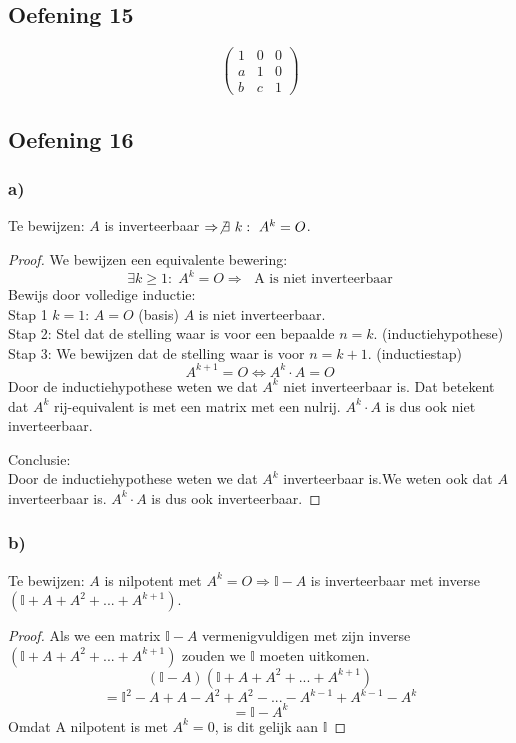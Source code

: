\documentclass[lineaire_algebra_oplossingen.tex]{subfiles}
\begin{document}
\subsection{Oefening 15}
\[
\begin{pmatrix}
1 & 0 & 0\\
a & 1 & 0\\
b & c & 1
\end{pmatrix}
\]

\subsection{Oefening 16}
\subsubsection*{a)}
Te bewijzen: $A$ is inverteerbaar $\Rightarrow \not \exists\ k :\ A^k=O$.
\begin{proof}
We bewijzen een equivalente bewering:
\[
\exists k\ge 1:\;A^k=O \Rightarrow\; \text{ A is niet inverteerbaar}
\]
Bewijs door volledige inductie:\\
Stap 1 $k=1$: $A=O$ (basis)
$A$ is niet inverteerbaar.\\
Stap 2: Stel dat de stelling waar is voor een bepaalde $n=k$. (inductiehypothese)\\

Stap 3: We bewijzen dat de stelling waar is voor $n=k+1$. (inductiestap)\\
\[ A^{k+1}=O \Leftrightarrow A^{k}\cdot A=O \]
Door de inductiehypothese weten we dat $A^{k}$ niet inverteerbaar is. Dat betekent dat $A^{k}$ rij-equivalent is met een matrix met een nulrij. $A^{k} \cdot A$ is dus ook niet inverteerbaar.

Conclusie:\\
Door de inductiehypothese weten we dat $A^{k}$ inverteerbaar is.We weten ook dat $A$ inverteerbaar is. $A^{k} \cdot A$ is dus ook inverteerbaar.

\end{proof}

\subsubsection*{b)}
Te bewijzen: $A$ is nilpotent met $A^k=O \Rightarrow \mathbb{I}-A$ is inverteerbaar met inverse $(\mathbb{I}+A+A^2+...+A^{k+1})$.
\begin{proof}
Als we een matrix $\mathbb{I}-A$ vermenigvuldigen met zijn inverse $(\mathbb{I}+A+A^2+...+A^{k+1})$ zouden we $\mathbb{I}$ moeten uitkomen.
\[ (\mathbb{I}-A)(\mathbb{I}+A+A^2+...+A^{k+1}) \]
\[ = \mathbb{I}^{2} -A+A-A^{2}+A^{2}-...-A^{k-1}+A^{k-1}-A^{k}\]
\[ = \mathbb{I}-A^{k}\]
Omdat A nilpotent is met $A^k=0$, is dit gelijk aan $\mathbb{I}$
\end{proof}
\end{document}
